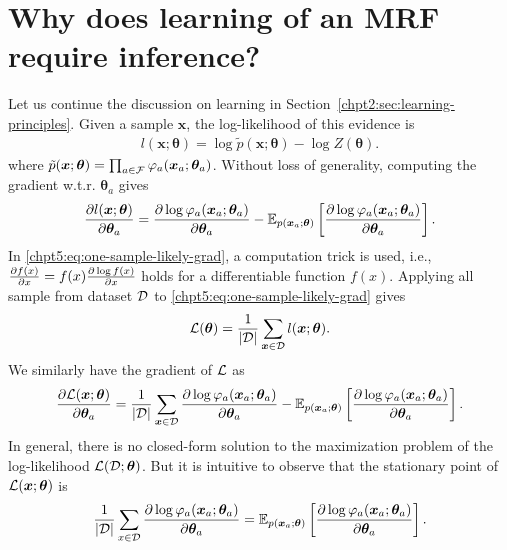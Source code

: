 \section{Why does learning of an MRF require inference?}
\label{chpt5:sec:learning-mrf}
Let us continue the discussion on learning in Section~\ref{chpt2:sec:learning-principles}. Given a sample $\bm{x}$, the log-likelihood of this evidence is
\begin{align}\label{chpt5:eq:one-sample-likely}
  l(\bm{x};\bm{\theta}) = \log{\tilde{p}(\bm{x}; \bm{\theta})} - \log{Z(\bm{\theta})}.
\end{align}
where $\tilde{p}(\bm{x}; \bm{\theta}) =  \prod_{a\in \mathcal{F}} \varphi_a(\bm{x}_a; \bm{\theta}_a)$. 
Without loss of generality, computing the gradient w.t.r. $\bm{\theta}_a$ gives
\begin{align}\label{chpt5:eq:one-sample-likely-grad}
  \frac{ \partial l(\bm{x};\bm{\theta})}{\partial \bm{\theta}_a} = \frac{ \partial \log{{\varphi_a}(\bm{x}_a; \bm{\theta}_a)}}{\partial \bm{\theta}_a} - \mathbb{E}_{p(\bm{x}_a; \bm{\theta})}\left[ \frac{ \partial \log{{\varphi_a}(\bm{x}_a; \bm{\theta}_a)}}{\partial \bm{\theta}_a} \right].
\end{align}
In \eqref{chpt5:eq:one-sample-likely-grad}, a computation trick is used, i.e., $\frac{ \partial f(x)}{\partial x} = f(x) \frac{ \partial \log{f(x)}}{\partial x}$ holds for a differentiable function $f(x)$. Applying all sample from dataset $\mathcal{D}$ to \eqref{chpt5:eq:one-sample-likely-grad} gives
\begin{equation}\label{chpt4:eq:dataset-likely}
  \mathcal{L}(\bm{\theta}) = \frac{1}{|\mathcal{D} |} \sum_{\bm{x} \in \mathcal{D}} l(\bm{x}; \bm{\theta}).
\end{equation}
We similarly have the gradient of $\mathcal{L}$ as
\begin{equation}\label{chpt5:eq:likely-gradient-thetaa}
  \frac{ \partial \mathcal{L}(\bm{x};\bm{\theta})}{\partial \bm{\theta}_a} = \frac{1}{|\mathcal{D} |} \sum_{\bm{x} \in \mathcal{D}}\frac{ \partial \log{{\varphi_a}(\bm{x}_a; \bm{\theta}_a)}}{\partial \bm{\theta}_a} - \mathbb{E}_{p(\bm{x}_a; \bm{\theta})}\left[ \frac{ \partial \log{{\varphi_a}(\bm{x}_a; \bm{\theta}_a)}}{\partial \bm{\theta}_a} \right].
\end{equation}
In general, there is no closed-form solution to the maximization problem of the log-likelihood $\mathcal{L}(\mathcal{D}; \bm{\theta})$. But it is intuitive to observe that the stationary point of ${\mathcal{L}(\bm{x};\bm{\theta})}$ is
\begin{equation}\label{chpt5:eq:stationary-point-likely}
  \frac{1}{|\mathcal{D} |} \sum_{x \in \mathcal{D}}\frac{ \partial \log{{\varphi_a}(\bm{x}_a; \bm{\theta}_a)}}{\partial \bm{\theta}_a} = \mathbb{E}_{p(\bm{x}_a; \bm{\theta})}\left[ \frac{ \partial \log{{\varphi_a}(\bm{x}_a; \bm{\theta}_a)}}{\partial \bm{\theta}_a} \right].
\end{equation}
